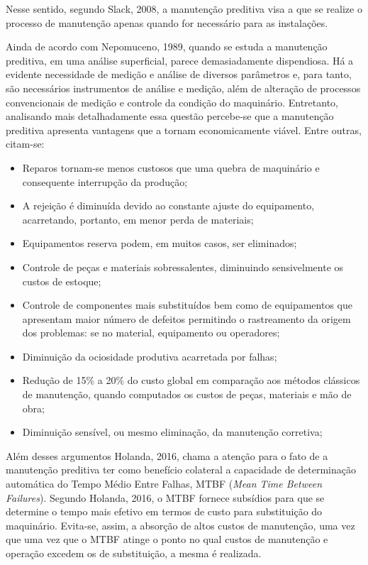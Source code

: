 \documentclass[
	12pt,				
	oneside,			
	a4paper,			
	english,			
	brazil,	
	sumario=abnt-6027-2012		
	]{abntex2ppgsi}
\begin{document}
Nesse sentido, segundo Slack, 2008, a manutenção preditiva visa a que se realize o processo de manutenção apenas quando for necessário para as instalações. 

Ainda de acordo com Nepomuceno, 1989, quando se estuda a manutenção preditiva, em uma análise superficial, parece demasiadamente dispendiosa. Há a evidente necessidade de medição e análise de diversos parâmetros e, para tanto, são necessários instrumentos de análise e medição, além de alteração de processos convencionais de medição e controle da condição do maquinário. Entretanto, analisando mais detalhadamente essa questão percebe-se que a manutenção preditiva apresenta vantagens que a tornam economicamente viável. Entre outras, citam-se: 

\begin{itemize}
	\item Reparos tornam-se menos custosos que uma quebra de maquinário e consequente interrupção da produção;
	\item A rejeição é diminuída devido ao constante ajuste do equipamento, acarretando, portanto, em menor perda de materiais;
	\item Equipamentos reserva podem, em muitos casos, ser eliminados;
	\item Controle de peças e materiais sobressalentes, diminuindo sensivelmente os custos de estoque;
	\item Controle de componentes mais substituídos bem como de equipamentos que apresentam maior número de defeitos permitindo o rastreamento da origem dos problemas: se no material, equipamento ou operadores;
	\item Diminuição da ociosidade produtiva acarretada por falhas;
	\item Redução de 15\% a 20\% do custo global em comparação aos métodos clássicos de manutenção, quando computados os custos de peças, materiais e mão de obra;
	\item Diminuição sensível, ou mesmo eliminação, da manutenção corretiva;
\end{itemize}

Além desses argumentos Holanda, 2016, chama a atenção para o fato de a manutenção preditiva ter como benefício colateral a capacidade de determinação automática do Tempo Médio Entre Falhas, MTBF (\textit{Mean Time Between Failures}). Segundo Holanda, 2016, o MTBF fornece subsídios para que se determine o tempo mais efetivo em termos de custo para substituição do maquinário. Evita-se, assim, a absorção de altos custos de manutenção, uma vez que uma vez que o MTBF atinge o ponto no qual custos de manutenção e operação excedem os de substituição, a mesma é realizada. 
\end{document}
